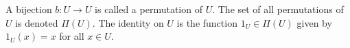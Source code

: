 A bijection $b: U \rightarrow U$ is called a permutation of $U$. The set of all permutations of $U$ is denoted $\Pi(U)$. The identity on $U$ is the function $1_U \in \Pi(U)$ given by $1_U(x) = x$ for all $x \in U$.
